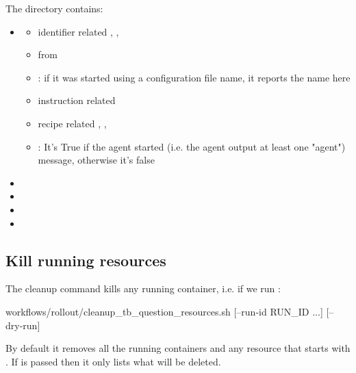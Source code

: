 \documentclass[11pt]{article}
\begin{document}
The directory contains:
\begin{itemize}
  \item {}
  \begin{itemize}
    \item identifier related , , 
    \item {} from 
    \item {}: if it was started using a configuration file name, it reports the name here
    \item instruction related 
    \item recipe related \termDescLevel, , 
    \item {}: It's True if the agent started (i.e. the agent output at least one "agent") message, otherwise it's false
  \end{itemize}
  \item {}
  \item {}
  \item {}
  \item {}
\end{itemize}

\subsection*{Kill running resources}

The cleanup command kills any running container, i.e. if we run :
\begin{DocCode}
workflows/rollout/cleanup_tb_question_resources.sh [--run-id RUN_ID ...] [--dry-run]
\end{DocCode}
By default it removes all the running containers and any resource that starts with .
If  is passed then it only lists what will be deleted.
\end{document}

